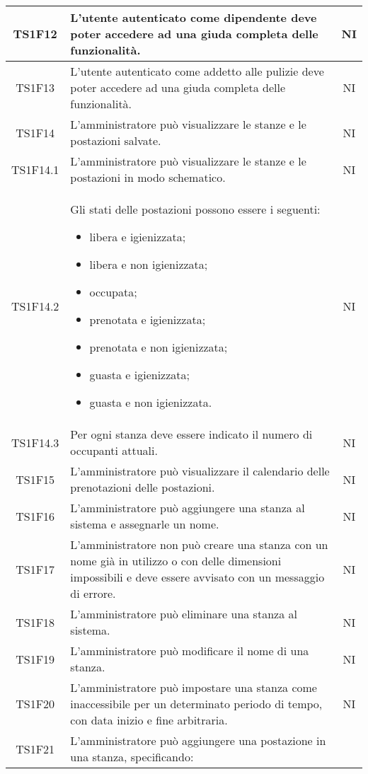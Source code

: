 \begin{center}
\begin{longtable}{|c|p{10cm}|c|}
			\hline
			TS1F12 & L'utente autenticato come dipendente deve poter accedere ad una giuda completa delle funzionalità. & NI \\			
			\hline
			TS1F13 & L'utente autenticato come addetto alle pulizie deve poter accedere ad una giuda completa delle funzionalità. & NI \\
			\hline
			TS1F14 & L'amministratore può visualizzare le stanze e le postazioni salvate. & NI \\			
			\hline
			TS1F14.1 & L'amministratore può visualizzare le stanze e le postazioni in modo schematico. & NI \\			
			\hline
			TS1F14.2 & Gli stati delle postazioni possono essere i seguenti:
			 \begin{itemize}
			 	\item libera e igienizzata;
			 	\item libera e non igienizzata;
			 	\item occupata;
			 	\item prenotata e igienizzata;
			 	\item prenotata e non igienizzata;
			 	\item guasta e igienizzata;
			 	\item guasta e non igienizzata.
			 \end{itemize}
			 & NI \\			
			\hline
			TS1F14.3 & Per ogni stanza deve essere indicato il numero di occupanti attuali. & NI \\			
			\hline
			TS1F15 & L'amministratore può visualizzare il calendario delle prenotazioni delle postazioni. & NI \\			
			\hline
			TS1F16 & L'amministratore può aggiungere una stanza al sistema e assegnarle un nome. & NI \\			
			\hline
			TS1F17 & L'amministratore non può creare una stanza con un nome già in utilizzo o con delle dimensioni impossibili e deve essere avvisato con un messaggio di errore. & NI \\			
			\hline
			TS1F18 & L'amministratore può eliminare una stanza al sistema. & NI \\			
			\hline
			TS1F19 & L'amministratore può modificare il nome di una stanza. & NI \\			
			\hline
			TS1F20 & L'amministratore può impostare una stanza come inaccessibile per un determinato periodo di tempo, con data inizio e fine arbitraria. & NI \\			
			\hline
			TS1F21 & L'amministratore può aggiungere una postazione in una stanza, specificando:

\end{longtable}
\end{center}

